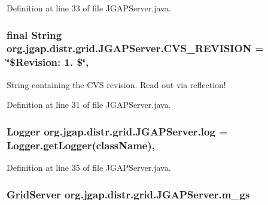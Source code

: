 Definition at line 33 of file J\-G\-A\-P\-Server.\-java.

\hypertarget{classorg_1_1jgap_1_1distr_1_1grid_1_1_j_g_a_p_server_a1934a35759460fe9f868474cc40792b7}{
\subsubsection[{C\-V\-S\-\_\-\-R\-E\-V\-I\-S\-I\-O\-N}]{\setlength{\rightskip}{0pt plus 5cm}final String org.\-jgap.\-distr.\-grid.\-J\-G\-A\-P\-Server.\-C\-V\-S\-\_\-\-R\-E\-V\-I\-S\-I\-O\-N = \char`\"{}\$Revision\-: 1. \$\char`\"{}\hspace{0.3cm}{\ttfamily [static]}, {\ttfamily [private]}}}\label{classorg_1_1jgap_1_1distr_1_1grid_1_1_j_g_a_p_server_a1934a35759460fe9f868474cc40792b7}
String containing the C\-V\-S revision. Read out via reflection! 

Definition at line 31 of file J\-G\-A\-P\-Server.\-java.

\hypertarget{classorg_1_1jgap_1_1distr_1_1grid_1_1_j_g_a_p_server_a8e3b3649d3f722e5458907aa0801d91b}{
\subsubsection[{log}]{\setlength{\rightskip}{0pt plus 5cm}Logger org.\-jgap.\-distr.\-grid.\-J\-G\-A\-P\-Server.\-log = Logger.\-get\-Logger({\bf class\-Name})\hspace{0.3cm}{\ttfamily [static]}, {\ttfamily [private]}}}\label{classorg_1_1jgap_1_1distr_1_1grid_1_1_j_g_a_p_server_a8e3b3649d3f722e5458907aa0801d91b}


Definition at line 35 of file J\-G\-A\-P\-Server.\-java.

\hypertarget{classorg_1_1jgap_1_1distr_1_1grid_1_1_j_g_a_p_server_a5fe0547d2bcf14f6e7505c1fead8dfea}{
\subsubsection[{m\-\_\-gs}]{\setlength{\rightskip}{0pt plus 5cm}Grid\-Server org.\-jgap.\-distr.\-grid.\-J\-G\-A\-P\-Server.\-m\-\_\-gs\hspace{0.3cm}{\ttfamily [private]}}}\label{classorg_1_1jgap_1_1distr_1_1grid_1_1_j_g_a_p_server_a5fe0547d2bcf14f6e7505c1fead8dfea}


